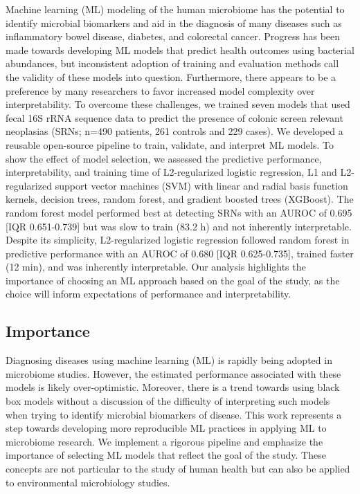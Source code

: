 \documentclass[
  11pt,
]{article}
\begin{document}
Machine learning (ML) modeling of the human microbiome has the potential
to identify microbial biomarkers and aid in the diagnosis of many
diseases such as inflammatory bowel disease, diabetes, and colorectal
cancer. Progress has been made towards developing ML models that predict
health outcomes using bacterial abundances, but inconsistent adoption of
training and evaluation methods call the validity of these models into
question. Furthermore, there appears to be a preference by many
researchers to favor increased model complexity over interpretability.
To overcome these challenges, we trained seven models that used fecal
16S rRNA sequence data to predict the presence of colonic screen
relevant neoplasias (SRNs; n=490 patients, 261 controls and 229 cases).
We developed a reusable open-source pipeline to train, validate, and
interpret ML models. To show the effect of model selection, we assessed
the predictive performance, interpretability, and training time of
L2-regularized logistic regression, L1 and L2-regularized support vector
machines (SVM) with linear and radial basis function kernels, decision
trees, random forest, and gradient boosted trees (XGBoost). The random
forest model performed best at detecting SRNs with an AUROC of 0.695
{[}IQR 0.651-0.739{]} but was slow to train (83.2 h) and not inherently
interpretable. Despite its simplicity, L2-regularized logistic
regression followed random forest in predictive performance with an
AUROC of 0.680 {[}IQR 0.625-0.735{]}, trained faster (12 min), and was
inherently interpretable. Our analysis highlights the importance of
choosing an ML approach based on the goal of the study, as the choice
will inform expectations of performance and interpretability.

\newpage

\hypertarget{importance}{%
\subsection{Importance}\label{importance}}

Diagnosing diseases using machine learning (ML) is rapidly being adopted
in microbiome studies. However, the estimated performance associated
with these models is likely over-optimistic. Moreover, there is a trend
towards using black box models without a discussion of the difficulty of
interpreting such models when trying to identify microbial biomarkers of
disease. This work represents a step towards developing more
reproducible ML practices in applying ML to microbiome research. We
implement a rigorous pipeline and emphasize the importance of selecting
ML models that reflect the goal of the study. These concepts are not
particular to the study of human health but can also be applied to
environmental microbiology studies.
\end{document}
